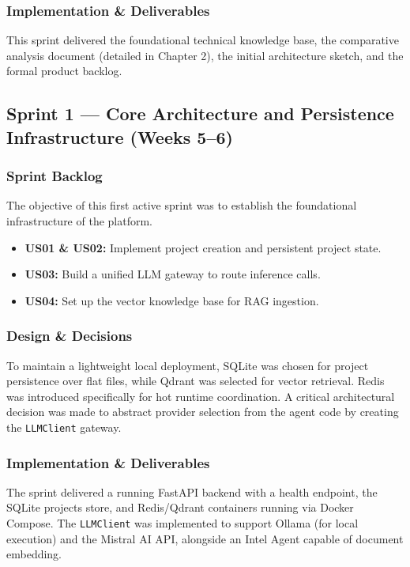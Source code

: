 \documentclass[12pt,a4paper]{report}
\begin{document}
\subsubsection{Implementation \& Deliverables}
This sprint delivered the foundational technical knowledge base, the comparative analysis document (detailed in Chapter 2), the initial architecture sketch, and the formal product backlog.

\subsection{Sprint 1 --- Core Architecture and Persistence Infrastructure (Weeks 5--6)}

\subsubsection{Sprint Backlog}
The objective of this first active sprint was to establish the foundational infrastructure of the platform.
\begin{itemize}
    \item \textbf{US01 \& US02:} Implement project creation and persistent project state.
    \item \textbf{US03:} Build a unified LLM gateway to route inference calls.
    \item \textbf{US04:} Set up the vector knowledge base for RAG ingestion.
\end{itemize}

\subsubsection{Design \& Decisions}
To maintain a lightweight local deployment, SQLite was chosen for project persistence over flat files, while Qdrant was selected for vector retrieval. Redis was introduced specifically for hot runtime coordination. A critical architectural decision was made to abstract provider selection from the agent code by creating the \texttt{LLMClient} gateway.

\subsubsection{Implementation \& Deliverables}
The sprint delivered a running FastAPI backend with a health endpoint, the SQLite projects store, and Redis/Qdrant containers running via Docker Compose. The \texttt{LLMClient} was implemented to support Ollama (for local execution) and the Mistral AI API, alongside an Intel Agent capable of document embedding.
\end{document}
